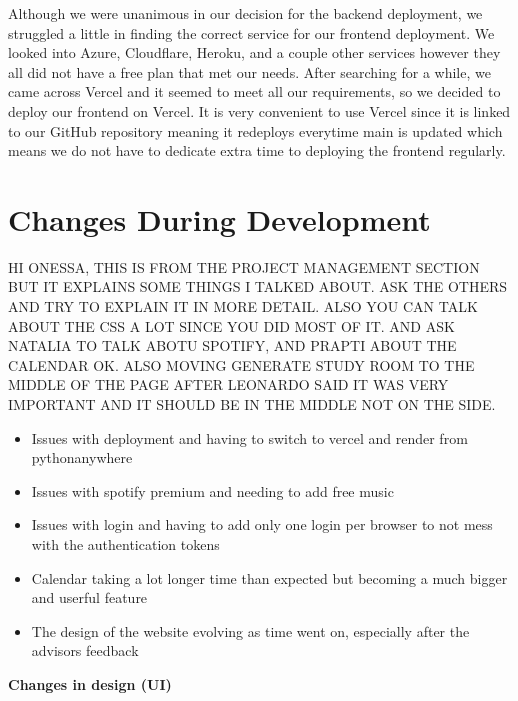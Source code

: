 Although we were unanimous in our decision for the backend deployment, we struggled a little in finding the correct service for our frontend deployment. We looked into Azure, Cloudflare, Heroku, and a couple other services however they all did not have a free plan that met our needs. After searching for a while, we came across Vercel and it seemed to meet all our requirements, so we decided to deploy our frontend on Vercel. It is very convenient to use Vercel since it is linked to our GitHub repository meaning it redeploys everytime main is updated which means we do not have to dedicate extra time to deploying the frontend regularly.



\section{Changes During Development}
\label{sect:changes-during-development}

HI ONESSA, THIS IS FROM THE PROJECT MANAGEMENT SECTION BUT IT EXPLAINS SOME THINGS I TALKED ABOUT. ASK THE OTHERS AND TRY TO EXPLAIN IT IN MORE DETAIL. ALSO YOU CAN TALK ABOUT THE CSS A LOT SINCE YOU DID MOST OF IT. AND ASK NATALIA TO TALK ABOTU SPOTIFY, AND PRAPTI ABOUT THE CALENDAR OK. ALSO MOVING GENERATE STUDY ROOM TO THE MIDDLE OF THE PAGE AFTER LEONARDO SAID IT WAS VERY IMPORTANT AND IT SHOULD BE IN THE MIDDLE NOT ON THE SIDE.
\begin{itemize}
    \item Issues with deployment and having to switch to vercel and render from pythonanywhere
    \item Issues with spotify premium and needing to add free music
    \item Issues with login and having to add only one login per browser to not mess with the authentication tokens
    \item Calendar taking a lot longer time than expected but becoming a much bigger and userful feature
    \item The design of the website evolving as time went on, especially after the advisors feedback
\end{itemize}

\textbf{Changes in design (UI)}

